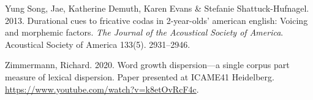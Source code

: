 \documentclass[
]{article}
\newlength{\cslhangindent}
\newlength{\cslentryspacingunit} %
\newenvironment{CSLReferences}[2] %
 {%
  \setlength{\parindent}{0pt}
  \ifodd #1
  \let\oldpar\par
  \def\par{\hangindent=\cslhangindent\oldpar}
  \fi
  \setlength{\parskip}{#2\cslentryspacingunit}
 }%
 {}
\begin{document}
\begin{CSLReferences}{1}{0}
\leavevmode{}%
Yung Song, Jae, Katherine Demuth, Karen Evans \& Stefanie
Shattuck-Hufnagel. 2013. Durational cues to fricative codas in
2-year-olds' american english: Voicing and morphemic factors. \emph{The
Journal of the Acoustical Society of America}. Acoustical Society of
America 133(5). 2931--2946.

\leavevmode{}%
Zimmermann, Richard. 2020. Word growth dispersion---a single corpus part
measure of lexical dispersion. Paper presented at ICAME41 Heidelberg.
\url{https://www.youtube.com/watch?v=k8etOvRcF4c}.

\end{CSLReferences}
\end{document}
